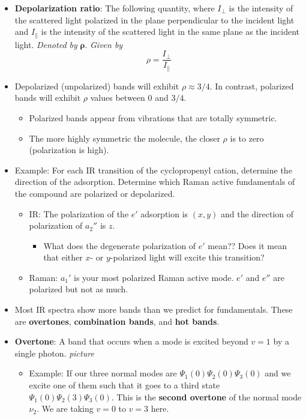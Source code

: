 \documentclass[../notes.tex]{subfiles}
\begin{document}
\begin{itemize}
\begin{itemize}
    \end{itemize}
    \item \textbf{Depolarization ratio}: The following quantity, where $I_\perp$ is the intensity of the scattered light polarized in the plane perpendicular to the incident light and $I_\parallel$ is the intensity of the scattered light in the same plane as the incident light. \emph{Denoted by} $\bm{\rho}$. \emph{Given by}
    \begin{equation*}
        \rho = \frac{I_\perp}{I_\parallel}
    \end{equation*}
    \item Depolarized (unpolarized) bands will exhibit $\rho\approx 3/4$. In contrast, polarized bands will exhibit $\rho$ values between 0 and $3/4$.
    \begin{itemize}
        \item Polarized bands appear from vibrations that are totally symmetric.
        \item The more highly symmetric the molecule, the closer $\rho$ is to zero (polarization is high).
    \end{itemize}
    \item Example: For each IR transition of the cyclopropenyl cation, determine the direction of the adsorption. Determine which Raman active fundamentals of the compound are polarized or depolarized.
    \begin{itemize}
        \item IR: The polarization of the $e'$ adsorption is $(x,y)$ and the direction of polarization of $a_2''$ is $z$.
        \begin{itemize}
            \item What does the degenerate polarization of $e'$ mean?? Does it mean that either $x$- or $y$-polarized light will excite this transition?
        \end{itemize}
        \item Raman: $a_1'$ is your most polarized Raman active mode. $e'$ and $e''$ are polarized but not as much.
    \end{itemize}
    \item Most IR spectra show more bands than we predict for fundamentals. These are \textbf{overtones}, \textbf{combination bands}, and \textbf{hot bands}.
    \item \textbf{Overtone}: A band that occurs when a mode is excited beyond $v=1$ by a single photon.
    \emph{picture}
    \begin{itemize}
        \item Example: If our three normal modes are $\Psi_1(0)\Psi_2(0)\Psi_3(0)$ and we excite one of them such that it goes to a third state $\Psi_1(0)\Psi_2(3)\Psi_3(0)$. This is the \textbf{second overtone} of the normal mode $\nu_2$. We are taking $v=0$ to $v=3$ here.

\end{itemize}
\end{itemize}
\end{document}

